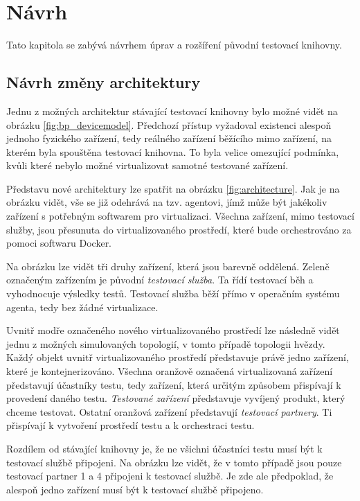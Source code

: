 \chapter{Návrh}\label{chap:design}

Tato kapitola se zabývá návrhem úprav a rozšíření původní testovací knihovny.

\section{Návrh změny architektury}

Jednu z možných architektur stávající testovací knihovny bylo možné vidět na obrázku \ref{fig:bp_devicemodel}. Předchozí přístup vyžadoval existenci alespoň jednoho fyzického zařízení, tedy reálného zařízení běžícího mimo zařízení, na kterém byla spouštěna testovací knihovna. To byla velice omezující podmínka, kvůli které nebylo možné virtualizovat samotné testované zařízení.

Představu nové architektury lze spatřit na obrázku \ref{fig:architecture}. Jak je na obrázku vidět, vše se již odehrává na tzv. agentovi, jímž může být jakékoliv zařízení s potřebným softwarem pro virtualizaci. Všechna zařízení, mimo testovací služby, jsou přesunuta do virtualizovaného prostředí, které bude orchestrováno za pomoci softwaru Docker. 

Na obrázku lze vidět tři druhy zařízení, která jsou barevně oddělená. Zeleně označeným zařízením je původní \textit{testovací služba}. Ta řídí testovací běh a vyhodnocuje výsledky testů. Testovací služba běží přímo v operačním systému agenta, tedy bez žádné virtualizace. 

Uvnitř modře označeného nového virtualizovaného prostředí lze následně vidět jednu z možných simulovaných topologií, v tomto případě topologii hvězdy. Každý objekt uvnitř virtualizovaného prostředí představuje právě jedno zařízení, které je kontejnerizováno. Všechna oranžově označená virtualizovaná zařízení představují účastníky testu, tedy zařízení, která určitým způsobem přispívají k provedení daného testu. \textit{Testované zařízení} představuje vyvíjený produkt, který chceme testovat. Ostatní oranžová zařízení představují \textit{testovací partnery}. Ti přispívají k vytvoření prostředí testu a k orchestraci testu.

Rozdílem od stávající knihovny je, že ne všichni účastníci testu musí být k testovací službě připojeni. Na obrázku lze vidět, že v tomto případě jsou pouze testovací partner 1 a 4 připojeni k testovací službě. Je zde ale předpoklad, že alespoň jedno zařízení musí být k testovací službě připojeno.

